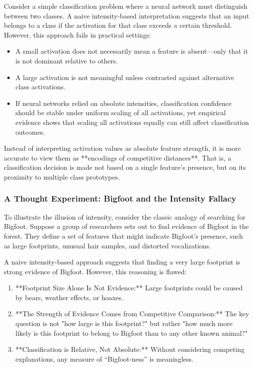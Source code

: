 \documentclass[12pt]{article}
\begin{document}
Consider a simple classification problem where a neural network must distinguish between two classes. A naive intensity-based interpretation suggests that an input belongs to a class if the activation for that class exceeds a certain threshold. However, this approach fails in practical settings:

\begin{itemize}
    \item A small activation does not necessarily mean a feature is absent—only that it is not dominant relative to others.
    \item A large activation is not meaningful unless contrasted against alternative class activations.
    \item If neural networks relied on absolute intensities, classification confidence should be stable under uniform scaling of all activations, yet empirical evidence shows that scaling all activations equally can still affect classification outcomes.
\end{itemize}

Instead of interpreting activation values as absolute feature strength, it is more accurate to view them as **encodings of competitive distances**. That is, a classification decision is made not based on a single feature’s presence, but on its proximity to multiple class prototypes.

\subsubsection{A Thought Experiment: Bigfoot and the Intensity Fallacy}

To illustrate the illusion of intensity, consider the classic analogy of searching for Bigfoot. Suppose a group of researchers sets out to find evidence of Bigfoot in the forest. They define a set of features that might indicate Bigfoot’s presence, such as large footprints, unusual hair samples, and distorted vocalizations.

A naive intensity-based approach suggests that finding a very large footprint is strong evidence of Bigfoot. However, this reasoning is flawed:

\begin{enumerate}
    \item **Footprint Size Alone Is Not Evidence:** Large footprints could be caused by bears, weather effects, or hoaxes.
    \item **The Strength of Evidence Comes from Competitive Comparison:** The key question is not "how large is this footprint?" but rather "how much more likely is this footprint to belong to Bigfoot than to any other known animal?"
    \item **Classification is Relative, Not Absolute:** Without considering competing explanations, any measure of “Bigfoot-ness” is meaningless.
\end{enumerate}
\end{document}

